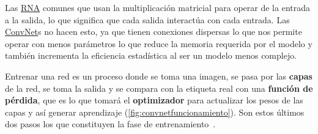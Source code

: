 Las \hyperlink{abbr}{RNA} comunes que usan la multiplicación matricial para
operar de la entrada a la salida, lo que significa que cada salida interactúa
con cada entrada. Las \hyperlink{abbr}{ConvNet}s no hacen esto, ya que tienen
conexiones dispersas lo que nos permite operar con menos parámetros lo que
reduce la memoria requerida por el modelo y también incrementa la eficiencia
estadística al ser un modelo menos complejo.

Entrenar una red es un proceso donde se toma una imagen, se pasa por las
\textbf{capas} de la red, se toma la salida y se compara con la etiqueta real
con una \textbf{función de pérdida}, que es lo que tomará el
\textbf{optimizador} para actualizar los pesos de las capas y así generar
aprendizaje (\autoref{fig:convnetfuncionamiento}). Son estos últimos dos pasos
los que constituyen la fase de entrenamiento~\cite{Chollet2018}. 

